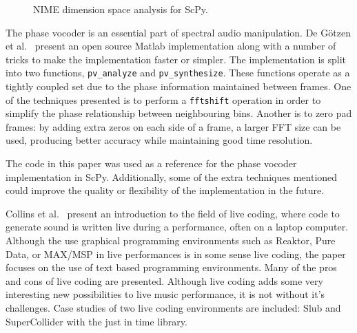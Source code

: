 \documentclass{article}
\begin{document}
\begin{figure}[ht]
    \caption{NIME dimension space analysis for ScPy.}\label{fig:nime}
    \begin{center}
    \end{center}
\end{figure}

The phase vocoder is an essential part of spectral audio manipulation. De G{\"o}tzen et
al.~\cite{de2000traditional} present an open source Matlab implementation along with a number of
tricks to make the implementation faster or simpler. The implementation is split into two
functions, \texttt{pv\_analyze} and \texttt{pv\_synthesize}. These functions operate as a tightly
coupled set due to the phase information maintained between frames. One of the techniques presented
is to perform a \texttt{fftshift} operation in order to simplify the phase relationship between
neighbouring bins. Another is to zero pad frames: by adding extra zeros on each side of a frame, a
larger FFT size can be used, producing better accuracy while maintaining good time resolution.

The code in this paper was used as a reference for the phase vocoder implementation in ScPy.
Additionally, some of the extra techniques mentioned could improve the quality or flexibility of
the implementation in the future.

Collins et al.~\cite{collins2003live} present an introduction to the field of live coding, where
code to generate sound is written live during a performance, often on a laptop computer. Although
the use graphical programming environments such as Reaktor, Pure Data, or MAX/MSP in live
performances is in some sense live coding, the paper focuses on the use of text based programming
environments. Many of the pros and cons of live coding are presented. Although live coding adds
some very interesting new possibilities to live music performance, it is not without it's
challenges. Case studies of two live coding environments are included: Slub and SuperCollider with
the just in time library.
\end{document}
